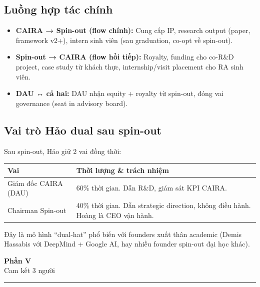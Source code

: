 \documentclass[11pt,a4paper]{article}
\begin{document}
\subsection{Luồng hợp tác chính}

\begin{itemize}
\item \textbf{CAIRA → Spin-out (flow chính):} Cung cấp IP, research output (paper, framework v2+), intern sinh viên (sau graduation, co-opt về spin-out).
\item \textbf{Spin-out → CAIRA (flow hồi tiếp):} Royalty, funding cho co-R\&D project, case study từ khách thực, internship/visit placement cho RA sinh viên.
\item \textbf{DAU ↔ cả hai:} DAU nhận equity + royalty từ spin-out, đóng vai governance (seat in advisory board).
\end{itemize}

\subsection{Vai trò Hảo dual sau spin-out}

Sau spin-out, Hảo giữ 2 vai đồng thời:

\begin{tabularx}{\linewidth}{@{}p{4cm} X@{}}
\toprule
\textbf{Vai} & \textbf{Thời lượng \& trách nhiệm} \\
\midrule
Giám đốc CAIRA (DAU) & 60\% thời gian. Dẫn R\&D, giám sát KPI CAIRA. \\
Chairman Spin-out & 40\% thời gian. Dẫn strategic direction, không điều hành. Hoàng là CEO vận hành. \\
\bottomrule
\end{tabularx}

Đây là mô hình ``dual-hat'' phổ biến với founders xuất thân academic (Demis
Hassabis với DeepMind + Google AI, hay nhiều founder spin-out đại học khác).

\clearpage

\begin{center}
\vspace*{0.5em}
{\sffamily\bfseries\Huge\color{ink} Phần V}\\[0.5em]
{\sffamily\LARGE\color{mid} Cam kết 3 người}\\[0.5em]
{\color{ink}\rule{6cm}{0.4pt}}
\end{center}
\vspace{1em}
\end{document}
